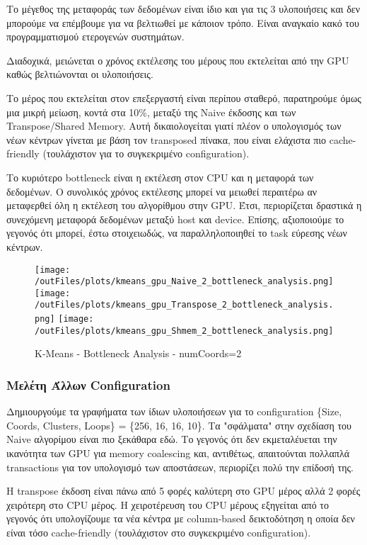 \documentclass[../final_report.tex]{subfiles}
\begin{document}
Το μέγεθος της μεταφοράς των δεδομένων είναι ίδιο και για τις 3 υλοποιήσεις και δεν μπορούμε να επέμβουμε
για να βελτιωθεί με κάποιον τρόπο. Είναι αναγκαίο κακό του προγραμματισμού ετερογενών συστημάτων.

Διαδοχικά, μειώνεται ο χρόνος εκτέλεσης του μέρους που εκτελείται από την GPU καθώς βελτιώνονται οι υλοποιήσεις.

Το μέρος που εκτελείται στον επεξεργαστή είναι περίπου σταθερό, παρατηρούμε όμως μια μικρή μείωση, κοντά στα 10\%,
μεταξύ της Naive έκδοσης και των Transpose/Shared Memory. Αυτή δικαιολογείται γιατί πλέον ο υπολογισμός των νέων κέντρων
γίνεται με βάση τον transposed πίνακα, που είναι ελάχιστα πιο cache-friendly (τουλάχιστον για το συγκεκριμένο configuration).

Το κυριότερο bottleneck είναι η εκτέλεση στον CPU και η μεταφορά των δεδομένων. Ο συνολικός χρόνος εκτέλεσης μπορεί να 
μειωθεί περαιτέρω αν μεταφερθεί όλη η εκτέλεση του αλγορίθμου στην GPU. Έτσι, περιορίζεται δραστικά η συνεχόμενη μεταφορά 
δεδομένων μεταξύ host και device. Επίσης, αξιοποιούμε το γεγονός ότι μπορεί, έστω στοιχειωδώς, να παραλληλοποιηθεί το task 
εύρεσης νέων κέντρων.

\begin{figure}[H]
    \centering
    \texttt{[image: /outFiles/plots/kmeans\_gpu\_Naive\_2\_bottleneck\_analysis.png]}
    \texttt{[image: /outFiles/plots/kmeans\_gpu\_Transpose\_2\_bottleneck\_analysis.png]}
    \texttt{[image: /outFiles/plots/kmeans\_gpu\_Shmem\_2\_bottleneck\_analysis.png]}
    \caption{K-Means - Bottleneck Analysis - numCoords=2}
    \label{fig:K-Means - Bottleneck Analysis - numCoords=2}
\end{figure}

\subsubsection*{Μελέτη Άλλων Configuration}

Δημιουργούμε τα γραφήματα των ίδιων υλοποιήσεων για το configuration \{Size, Coords, Clusters, Loops\} = \{256, 16, 16, 10\}.
Τα "σφάλματα" στην σχεδίαση του Naive αλγορίμου είναι πιο ξεκάθαρα εδώ. Το γεγονός ότι δεν εκμεταλέυεται την ικανότητα των 
GPU για memory coalescing και, αντιθέτως, απαιτούνται πολλαπλά transactions για τον υπολογισμό των αποστάσεων, περιορίζει πολύ την
επίδοσή της. 

Η transpose έκδοση είναι πάνω από 5 φορές καλύτερη στο GPU μέρος αλλά 2 φορές χειρότερη στο CPU μέρος. Η χειροτέρευση 
του CPU μέρους εξηγείται από το γεγονός ότι υπολογίζουμε τα νέα κέντρα με column-based δεικτοδότηση η οποία δεν είναι τόσο 
cache-friendly (τουλάχιστον στο συγκεκριμένο configuration).
\end{document}
